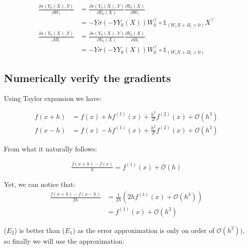 \documentclass{article}
\begin{document}
\begin{itemize}
\begin{framed}
\begin{align*}
\frac{\partial s(Y_0(X), Y)}{\partial W_i} &= \frac{\partial s(Y_0(X), Y)}{\partial Y_0(X)} \frac{\partial Y_0(X)}{\partial W_i} \\
&= -Y \sigma (-YY_0(X)) W^{\intercal}_0 \circ \mathds{1}_{(W_i X + B_i > 0)} X^{\intercal} \\
\frac{\partial s(Y_0(X), Y)}{\partial B_i} &= \frac{\partial s(Y_0(X), Y)}{\partial Y_0(X)} \frac{\partial Y_0(X)}{\partial B_i} \\
&= -Y \sigma (-YY_0(X)) W^{\intercal}_0 \circ \mathds{1}_{(W_i X + B_i > 0)}
\end{align*}
\end{framed}
\end{itemize}

\subsection{Numerically verify the gradients}

Using Taylor expansion we have:

\begin{align*}
f(x+h) &= f(x) + h f^{(1)}(x) + \frac{h^2}{2!}f^{(2)}(x) + \mathcal{O}(h^3) \\
f(x-h) &= f(x) - h f^{(1)}(x) + \frac{h^2}{2!}f^{(2)}(x) + \mathcal{O}(h^3)
\end{align*}

\noindent From what it naturally follows:

\begin{align}
\frac{f(x+h) - f(x)}{h} = f^{(1)}(x) + \mathcal{O}(h)\tag{$E_1$}
\end{align}

\noindent Yet, we can notice that:
\begin{align*}
\frac{f(x+h) - f(x-h)}{2h} &= \frac{1}{2h}(2hf^{(1)}(x) + \mathcal{O}(h^3)) \\
&= f^{(1)}(x) + \mathcal{O}(h^2)\tag{$E_2$}
\end{align*}

\noindent ($E_2$) is better than ($E_1$) as the error approximation is only on order of $\mathcal{O}(h^2))$, so finally we will use the approximation:
\end{document}

